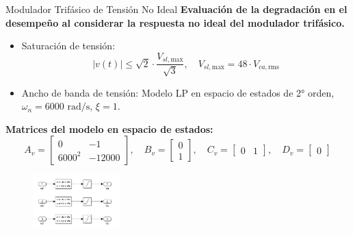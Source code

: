 \documentclass[12pt]{beamer}
\begin{document}
\begin{frame}{Modulador Trifásico de Tensión No Ideal}\small
    \textbf{Evaluación de la degradación en el desempeño al considerar la respuesta no ideal del modulador trifásico.}
    \begin{itemize}
        \item Saturación de tensión: 
        \[
        |v(t)| \leq \sqrt{2} \cdot \frac{V_{sl, \text{max}}}{\sqrt{3}}, \quad V_{sl, \text{max}} = 48 \cdot V_{ca, \text{rms}}
        \]
        \item Ancho de banda de tensión: Modelo LP en espacio de estados de 2° orden, \(\omega_n = 6000 \text{ rad/s}\), \(\xi = 1\).
    \end{itemize}

        \textbf{Matrices del modelo en espacio de estados:}
        \[
        A_v = \begin{bmatrix} 0 & -1 \\ 6000^2 & -12000 \end{bmatrix}, \quad 
        B_v = \begin{bmatrix} 0 \\ 1 \end{bmatrix}, \quad
        C_v = \begin{bmatrix} 0 & 1 \end{bmatrix}, \quad 
        D_v = \begin{bmatrix} 0 \end{bmatrix}
        \]

        \begin{figure}
            \centering
            \includegraphics[width=0.3\textwidth]{Imagenes/Bloques_Modulador_Tension_No_Ideal.png}
        \end{figure}
\end{frame}
\end{document}
